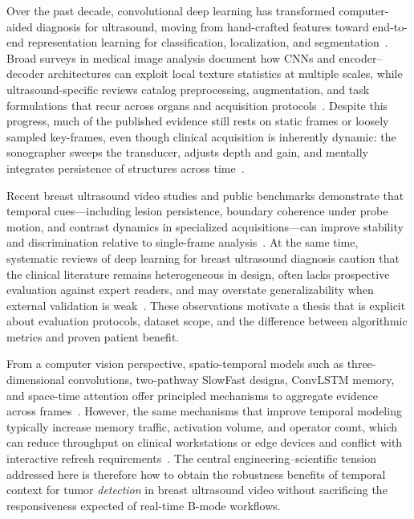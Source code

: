 \documentclass[
english,                 %
bibtex,                  %
]{kththesis}
\numberwithin{listing}{chapter}
\begin{document}
Over the past decade, convolutional deep learning has transformed computer-aided diagnosis for ultrasound, moving from hand-crafted features toward end-to-end representation learning for classification, localization, and segmentation~\cite{litjens2017_survey_deep_medical,wang2021_ultrasound_dl_review}.
Broad surveys in medical image analysis document how CNNs and encoder--decoder architectures can exploit local texture statistics at multiple scales, while ultrasound-specific reviews catalog preprocessing, augmentation, and task formulations that recur across organs and acquisition protocols~\cite{litjens2017_survey_deep_medical,wang2021_ultrasound_dl_review}.
Despite this progress, much of the published evidence still rests on static frames or loosely sampled key-frames, even though clinical acquisition is inherently dynamic: the sonographer sweeps the transducer, adjusts depth and gain, and mentally integrates persistence of structures across time~\cite{chen2021_ceus_domain,lin2022_buv_miccai,zhao2023_dynamic_us_video}.

Recent breast ultrasound video studies and public benchmarks demonstrate that temporal cues---including lesion persistence, boundary coherence under probe motion, and contrast dynamics in specialized acquisitions---can improve stability and discrimination relative to single-frame analysis~\cite{chen2021_ceus_domain,lin2022_buv_miccai,zhao2023_dynamic_us_video,zhang2024_whbus_isbi}.
At the same time, systematic reviews of deep learning for breast ultrasound diagnosis caution that the clinical literature remains heterogeneous in design, often lacks prospective evaluation against expert readers, and may overstate generalizability when external validation is weak~\cite{dan2024_breast_us_dl_review}.
These observations motivate a thesis that is explicit about evaluation protocols, dataset scope, and the difference between algorithmic metrics and proven patient benefit.

From a computer vision perspective, spatio-temporal models such as three-dimensional convolutions, two-pathway SlowFast designs, ConvLSTM memory, and space-time attention offer principled mechanisms to aggregate evidence across frames~\cite{huang2023_3dcnn_video_review,feichtenhofer2019_slowfast,shi2015_convlstm,bertasius2021_spacetime_attention,liu2022_video_swin_transformer}.
However, the same mechanisms that improve temporal modeling typically increase memory traffic, activation volume, and operator count, which can reduce throughput on clinical workstations or edge devices and conflict with interactive refresh requirements~\cite{huang2023_3dcnn_video_review,liu2023_edgemednet}.
The central engineering--scientific tension addressed here is therefore how to obtain the robustness benefits of temporal context for tumor \emph{detection} in breast ultrasound video without sacrificing the responsiveness expected of real-time B-mode workflows.
\end{document}
